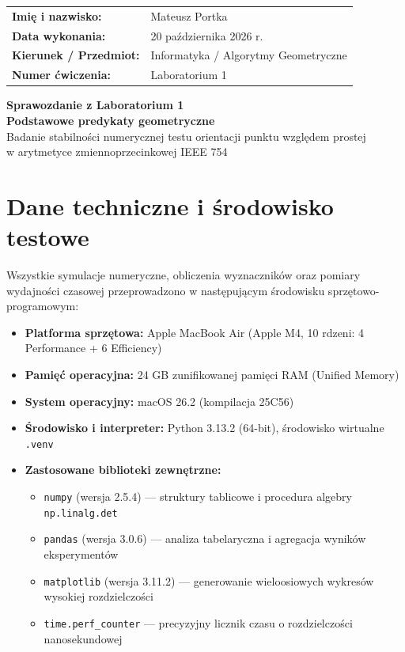\documentclass[10pt,a4paper]{article}
\begin{document}
\thispagestyle{empty}
\noindent
\begin{tabular}{ll}
\textbf{Imię i nazwisko:} & Mateusz Portka \\
\textbf{Data wykonania:} & 20 października 2026 r. \\
\textbf{Kierunek / Przedmiot:} & Informatyka / Algorytmy Geometryczne \\
\textbf{Numer ćwiczenia:} & Laboratorium 1
\end{tabular}

\vspace{2.5cm}

\begin{center}
    {\LARGE \textbf{Sprawozdanie z Laboratorium 1}}\\[0.4cm]
    {\Large \textbf{Podstawowe predykaty geometryczne}}\\[0.2cm]
    {\normalsize Badanie stabilności numerycznej testu orientacji punktu względem prostej\\
    w arytmetyce zmiennoprzecinkowej IEEE 754}
\end{center}

\vspace{2.5cm}

\tableofcontents
\newpage

\section{Dane techniczne i środowisko testowe}
Wszystkie symulacje numeryczne, obliczenia wyznaczników oraz pomiary wydajności czasowej przeprowadzono w następującym środowisku sprzętowo-programowym:
\begin{itemize}
    \item \textbf{Platforma sprzętowa:} Apple MacBook Air (Apple M4, 10 rdzeni: 4 Performance + 6 Efficiency)
    \item \textbf{Pamięć operacyjna:} 24 GB zunifikowanej pamięci RAM (Unified Memory)
    \item \textbf{System operacyjny:} macOS 26.2 (kompilacja 25C56)
    \item \textbf{Środowisko i interpreter:} Python 3.13.2 (64-bit), środowisko wirtualne \texttt{.venv}
    \item \textbf{Zastosowane biblioteki zewnętrzne:}
    \begin{itemize}
        \item \texttt{numpy} (wersja 2.5.4) --- struktury tablicowe i procedura algebry \texttt{np.linalg.det}
        \item \texttt{pandas} (wersja 3.0.6) --- analiza tabelaryczna i agregacja wyników eksperymentów
        \item \texttt{matplotlib} (wersja 3.11.2) --- generowanie wieloosiowych wykresów wysokiej rozdzielczości
        \item \texttt{time.perf\_counter} --- precyzyjny licznik czasu o rozdzielczości nanosekundowej
    \end{itemize}
\end{itemize}
\end{document}

